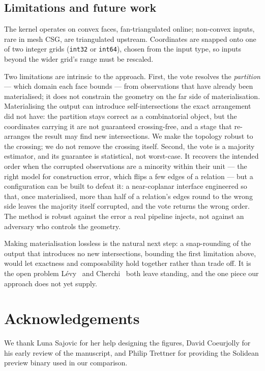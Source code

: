 \documentclass{egpubl}
\begin{document}
\subsection{Limitations and future work}

The kernel operates on convex faces, fan-triangulated online; non-convex inputs, rare in mesh CSG, are triangulated upstream. Coordinates are snapped onto one of two integer grids (\texttt{int32} or \texttt{int64}), chosen from the input type, so inputs beyond the wider grid's range must be rescaled.

Two limitations are intrinsic to the approach. First, the vote resolves the \emph{partition} --- which domain each face bounds --- from observations that have already been materialised; it does not constrain the geometry on the far side of materialisation. Materialising the output can introduce self-intersections the exact arrangement did not have: the partition stays correct as a combinatorial object, but the coordinates carrying it are not guaranteed crossing-free, and a stage that re-arranges the result may find new intersections. We make the topology robust to the crossing; we do not remove the crossing itself. Second, the vote is a majority estimator, and its guarantee is statistical, not worst-case. It recovers the intended order when the corrupted observations are a minority within their unit --- the right model for construction error, which flips a few edges of a relation --- but a configuration can be built to defeat it: a near-coplanar interface engineered so that, once materialised, more than half of a relation's edges round to the wrong side leaves the majority itself corrupted, and the vote returns the wrong order. The method is robust against the error a real pipeline injects, not against an adversary who controls the geometry.

Making materialisation lossless is the natural next step: a snap-rounding of the output that introduces no new intersections, bounding the first limitation above, would let exactness and composability hold together rather than trade off. It is the open problem L\'evy~\cite{Levy2025} and Cherchi~\cite{Cherchi2022} both leave standing, and the one piece our approach does not yet supply.

\section*{Acknowledgements}
We thank Luna Sajovic for her help designing the figures, David Coeurjolly for his early review of the manuscript, and Philip Trettner for providing the Solidean preview binary used in our comparison.
\end{document}
